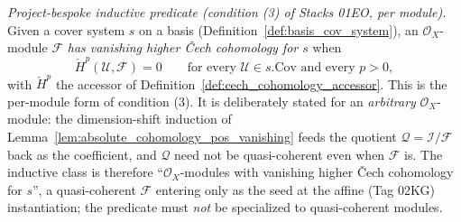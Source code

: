 \begin{definition}

  \label{def:has_vanishing_higher_cech}
  \textit{Project-bespoke inductive predicate (condition (3) of Stacks 01EO, per module).}
  Given a cover system \(s\) on a basis (Definition~\ref{def:basis_cov_system}), an
  \(\mathcal{O}_X\)-module \(\mathcal{F}\) \emph{has vanishing higher {\v C}ech cohomology for
  \(s\)} when
  \[
    \check{H}^p(\mathcal{U}, \mathcal{F}) = 0 \qquad
      \text{for every } \mathcal{U} \in s.\mathrm{Cov} \text{ and every } p > 0,
  \]
  with \(\check{H}^p\) the accessor of Definition~\ref{def:cech_cohomology_accessor}. This is the
  per-module form of condition (3). It is deliberately stated for an \emph{arbitrary}
  \(\mathcal{O}_X\)-module: the dimension-shift induction of
  Lemma~\ref{lem:absolute_cohomology_pos_vanishing} feeds the quotient \(\mathcal{Q} =
  \mathcal{I}/\mathcal{F}\) back as the coefficient, and \(\mathcal{Q}\) need not be quasi-coherent
  even when \(\mathcal{F}\) is. The inductive class is therefore ``\(\mathcal{O}_X\)-modules with
  vanishing higher {\v C}ech cohomology for \(s\)'', a quasi-coherent \(\mathcal{F}\) entering only
  as the seed at the affine (Tag 02KG) instantiation; the predicate must \emph{not} be specialized
  to quasi-coherent modules.
\end{definition}


